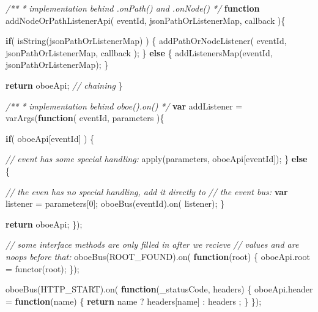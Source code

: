 \documentclass[12pt, ]{article}
\newenvironment{Shaded}{}{}
\newcommand{\KeywordTok}[1]{\textcolor[rgb]{0.00,0.44,0.13}{\textbf{{#1}}}}
\newcommand{\DecValTok}[1]{\textcolor[rgb]{0.25,0.63,0.44}{{#1}}}
\newcommand{\CommentTok}[1]{\textcolor[rgb]{0.38,0.63,0.69}{\textit{{#1}}}}
\newcommand{\OtherTok}[1]{\textcolor[rgb]{0.00,0.44,0.13}{{#1}}}
\newcommand{\FunctionTok}[1]{\textcolor[rgb]{0.02,0.16,0.49}{{#1}}}
\newcommand{\NormalTok}[1]{{#1}}
\begin{document}
\begin{Shaded}
\begin{Highlighting}[]
   \CommentTok{/**}
\CommentTok{    * implementation behind .onPath() and .onNode()}
\CommentTok{    */}       
   \KeywordTok{function} \FunctionTok{addNodeOrPathListenerApi}\NormalTok{( eventId, jsonPathOrListenerMap, callback )\{}
   
      \KeywordTok{if}\NormalTok{( }\FunctionTok{isString}\NormalTok{(jsonPathOrListenerMap) ) \{}
         \FunctionTok{addPathOrNodeListener}\NormalTok{( }
            \NormalTok{eventId, }
            \NormalTok{jsonPathOrListenerMap,}
            \NormalTok{callback}
         \NormalTok{);}
      \NormalTok{\} }\KeywordTok{else} \NormalTok{\{}
         \FunctionTok{addListenersMap}\NormalTok{(eventId, jsonPathOrListenerMap);}
      \NormalTok{\}}
      
      \KeywordTok{return} \NormalTok{oboeApi; }\CommentTok{// chaining}
   \NormalTok{\}}
      
   \CommentTok{/**}
\CommentTok{    * implementation behind oboe().on()}
\CommentTok{    */}       
   \KeywordTok{var} \NormalTok{addListener = }\FunctionTok{varArgs}\NormalTok{(}\KeywordTok{function}\NormalTok{( eventId, parameters )\{}

      \KeywordTok{if}\NormalTok{( oboeApi[eventId] ) \{}
      
         \CommentTok{// event has some special handling:}
         \FunctionTok{apply}\NormalTok{(parameters, oboeApi[eventId]);}
      \NormalTok{\} }\KeywordTok{else} \NormalTok{\{}
      
         \CommentTok{// the even has no special handling, add it directly to}
         \CommentTok{// the event bus:         }
         \KeywordTok{var} \NormalTok{listener = parameters[}\DecValTok{0}\NormalTok{]; }
         \FunctionTok{oboeBus}\NormalTok{(eventId).}\FunctionTok{on}\NormalTok{( listener);}
      \NormalTok{\}}
      
      \KeywordTok{return} \NormalTok{oboeApi;}
   \NormalTok{\});   }
   
   \CommentTok{// some interface methods are only filled in after we recieve}
   \CommentTok{// values and are noops before that:          }
   \FunctionTok{oboeBus}\NormalTok{(ROOT_FOUND).}\FunctionTok{on}\NormalTok{( }\KeywordTok{function}\NormalTok{(root) \{}
      \OtherTok{oboeApi}\NormalTok{.}\FunctionTok{root} \NormalTok{= }\FunctionTok{functor}\NormalTok{(root);   }
   \NormalTok{\});}
   
   \FunctionTok{oboeBus}\NormalTok{(HTTP_START).}\FunctionTok{on}\NormalTok{( }\KeywordTok{function}\NormalTok{(_statusCode, headers) \{}
      \OtherTok{oboeApi}\NormalTok{.}\FunctionTok{header} \NormalTok{= }
         \KeywordTok{function}\NormalTok{(name) \{}
            \KeywordTok{return} \NormalTok{name ? headers[name] }
                        \NormalTok{: headers}
                        \NormalTok{;}
         \NormalTok{\}}
   \NormalTok{\});}
      

\end{Highlighting}
\end{Shaded}
\end{document}
